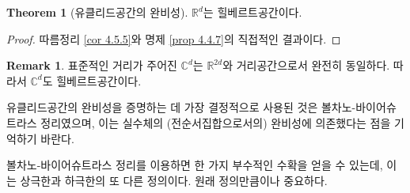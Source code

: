 \documentclass[11pt]{book}
\numberwithin{equation}{chapter}
\def\RR{\mathbb{R}}
\def\CC{\mathbb{C}}
\theoremstyle{definition}
\newtheorem{thm}{Theorem}[section]
\newtheorem*{rem}{Remark}
\begin{document}
\begin{thm} [유클리드공간의 완비성]
    \(\RR^d\)는 힐베르트공간이다.
\end{thm}
\begin{proof}
    따름정리 \ref{cor 4.5.5}와 명제 \ref{prop 4.4.7}의 직접적인 결과이다.
\end{proof}

\begin{rem}
    표준적인 거리가 주어진 \(\CC^{d}\)는 \(\RR^{2d}\)와 거리공간으로서 완전히 동일하다. 따라서 \(\CC^d\)도 힐베르트공간이다.
\end{rem}

유클리드공간의 완비성을 증명하는 데 가장 결정적으로 사용된 것은 볼차노-바이어슈트라스 정리였으며, 이는 실수체의 (전순서집합으로서의) 완비성에 의존했다는 점을 기억하기 바란다.

볼차노-바이어슈트라스 정리를 이용하면 한 가지 부수적인 수확을 얻을 수 있는데, 이는 상극한과 하극한의 또 다른 정의이다. 원래 정의만큼이나 중요하다.
\end{document}
